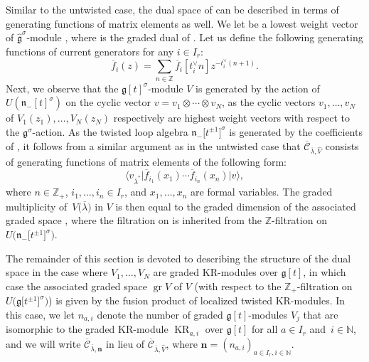 \documentclass[pdftex]{sigma}
\numberwithin{equation}{section}
\DeclareMathOperator{\gr}{gr}
\DeclareMathOperator{\KR}{KR}
\DeclareMathOperator{\Hom}{Hom}
\begin{document}
Similar to the untwisted case, the dual space  of \smash{$\Hom_{\widehat{\mathfrak{g}}^{\sigma}}\bigl(\widehat{V},\widehat{V}_{\kappa k,\overline{\lambda}}\bigr)$} can be described in terms of generating functions of matrix elements as well. We let  be a lowest weight vector of $\widehat{\mathfrak{g}}^{\sigma}$-module , where  is the graded dual of . Let us define the following generating functions of current generators for any $i\in I_r$:
\begin{equation*}
\overline{f}_i(z)=
\sum_{n\in\mathbb{Z}}\overline{f}_i[t_i^{\vee}n]z^{-t_i^{\vee}(n+1)}.
\end{equation*}
Next, we observe that the $\mathfrak{g}[t]^{\sigma}$-module $V$ is generated by the action of $U(\mathfrak{n}_-[t]^{\sigma})$ on the cyclic vector $v=v_1 \otimes\cdots\otimes v_N$, as the cyclic vectors $v_1,\dots,v_N$ of $V_1(z_1),\dots,V_N(z_N)$ respectively are highest weight vectors with respect to the $\mathfrak{g}^{\sigma}$-action. As the twisted loop algebra $\mathfrak{n}_-\bigl[t^{\pm1}\bigr]^{\sigma}$ is generated by the coefficients of , it follows from a similar argument as in the untwisted case that $\overline{\mathcal{C}}_{ \overline{\lambda},\widehat{V}}$ consists of generating functions of matrix elements of the following form:
\begin{equation}\label{eq:3.8}
\big\langle v_{\overline{\lambda}^*}\big|\overline{f}_{i_1}(x_1)\cdots \overline{f}_{i_n}(x_n)\big|v\big\rangle,
\end{equation}
where $n\in\mathbb{Z}_+$, $i_1,\dots,i_n\in I_r$, and $x_1, \dots,x_n$ are formal variables. The graded multiplicity of~$V\bigl(\overline{\lambda}\bigr)$ in $V$ is then equal to the graded dimension of the associated graded space \smash{$\gr\overline{ \mathcal{C}}_{\overline{\lambda},\widehat{V}}$}, where the filtration on  is inherited from the $\mathbb{Z}$-filtration on $U\bigl(\mathfrak{n}_-\bigl[t^{\pm1}\bigr]^{\sigma}\bigr)$.

The remainder of this section is devoted to describing the structure of the dual space  in the case where $V_1,\dots,V_N$ are graded KR-modules over $\mathfrak{g}[t]$, in which case the associated graded space $\gr V$ of $V$ (with respect to the $\mathbb{Z}_+$-filtration on $U\bigl(\mathfrak{g}\bigl[t^{\pm1}\bigr]^{\sigma}\bigr)$) is given by the fusion product of localized twisted KR-modules. In this case, we let $n_{a,i}$ denote the number of graded $\mathfrak{g}[t]$-modules $V_j$ that are isomorphic to the graded KR-module $\KR_{a,i}$ over $\mathfrak{g}[t]$ for all $a\in I_r$ and~${i\in\mathbb{N}}$, and we will write $\overline{\mathcal{C}}_{\overline{\lambda}, \mathbf{n}}$ in lieu of $\overline{\mathcal{C}}_ {\overline{\lambda},\widehat{V}}$, where $\mathbf{n}=(n_{a,i})_{a\in I_r,i\in\mathbb{N}}$.
\end{document}
